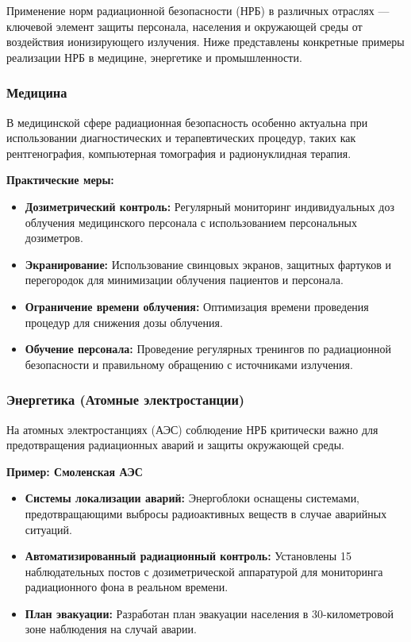 \documentclass[a4paper, 14pt]{extarticle}
\begin{document}
Применение норм радиационной безопасности (НРБ) в различных отраслях — ключевой элемент защиты персонала, населения и окружающей среды от воздействия ионизирующего излучения. Ниже представлены конкретные примеры реализации НРБ в медицине, энергетике и промышленности.

\subsubsection*{Медицина}

В медицинской сфере радиационная безопасность особенно актуальна при использовании диагностических и терапевтических процедур, таких как рентгенография, компьютерная томография и радионуклидная терапия.

\textbf{Практические меры:}
\begin{itemize}
    \item \textbf{Дозиметрический контроль:} Регулярный мониторинг индивидуальных доз облучения медицинского персонала с использованием персональных дозиметров.
    \item \textbf{Экранирование:} Использование свинцовых экранов, защитных фартуков и перегородок для минимизации облучения пациентов и персонала.
    \item \textbf{Ограничение времени облучения:} Оптимизация времени проведения процедур для снижения дозы облучения.
    \item \textbf{Обучение персонала:} Проведение регулярных тренингов по радиационной безопасности и правильному обращению с источниками излучения.
\end{itemize}

\subsubsection*{Энергетика (Атомные электростанции)}

На атомных электростанциях (АЭС) соблюдение НРБ критически важно для предотвращения радиационных аварий и защиты окружающей среды.

\textbf{Пример: Смоленская АЭС}
\begin{itemize}
    \item \textbf{Системы локализации аварий:} Энергоблоки оснащены системами, предотвращающими выбросы радиоактивных веществ в случае аварийных ситуаций.
    \item \textbf{Автоматизированный радиационный контроль:} Установлены 15 наблюдательных постов с дозиметрической аппаратурой для мониторинга радиационного фона в реальном времени.
    \item \textbf{План эвакуации:} Разработан план эвакуации населения в 30-километровой зоне наблюдения на случай аварии.
\end{itemize}
\end{document}
